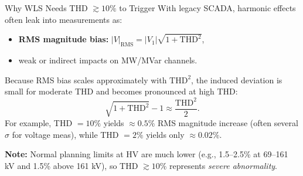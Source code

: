 \documentclass[aspectratio=169]{beamer}
\begin{document}
\begin{frame}{Why WLS Needs THD $\gtrsim 10\%$ to Trigger}
With legacy SCADA, harmonic effects often leak into measurements as:
\begin{itemize}
  \item \textbf{RMS magnitude bias:} $|V|_{\mathrm{RMS}} = |V_1|\sqrt{1+\mathrm{THD}^2}$,
  \item weak or indirect impacts on MW/MVar channels.
\end{itemize}

\vspace{0.4em}
Because RMS bias scales approximately with $\mathrm{THD}^2$, the induced deviation is small for moderate THD and becomes pronounced at high THD:
\[
\sqrt{1+\mathrm{THD}^2}-1 \approx \frac{\mathrm{THD}^2}{2}.
\]
For example, THD $=10\%$ yields $\approx 0.5\%$ RMS magnitude increase (often several $\sigma$ for voltage meas), while THD $=2\%$ yields only $\approx 0.02\%$.

\small
\textbf{Note:} Normal planning limits at HV are much lower (e.g., 1.5--2.5\% at 69--161 kV and 1.5\% above 161 kV), so THD $\gtrsim 10\%$ represents \emph{severe abnormality}.
\end{frame}
\end{document}
